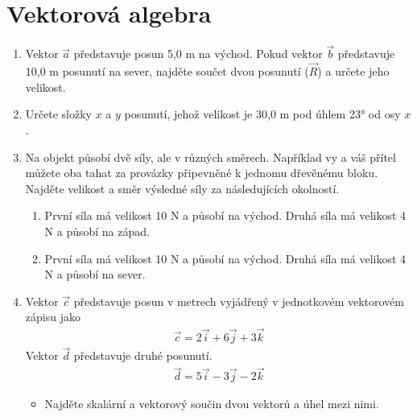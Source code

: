 \documentclass[letterpaper,10pt,english]{jupyterBook}
\begin{document}
{{\section{Vektorová algebra}
\label{\detokenize{Cviceni/C1:vektorova-algebra}}\begin{enumerate}
%
\item {} 
\sphinxAtStartPar
Vektor \(\vec{a}\) představuje posun 5,0 m na východ. Pokud vektor \(\vec{b}\) představuje 10,0 m posunutí na sever, najděte součet dvou posunutí (\(\vec{R}\)) a určete jeho velikost.

\item {} 
\sphinxAtStartPar
Určete složky \(x\) a \(y\) posunutí, jehož velikost je 30,0 m pod úhlem 23° od osy \(x\).

\item {} 
\sphinxAtStartPar
Na objekt působí dvě síly, ale v různých směrech. Například vy a váš přítel můžete oba tahat za provázky připevněné k jednomu dřevěnému bloku. Najděte velikost a směr výsledné síly za následujících okolností.
\begin{enumerate}
%
\item {} 
\sphinxAtStartPar
První síla má velikost 10 N a působí na východ. Druhá síla má velikost 4 N a působí na západ.

\item {} 
\sphinxAtStartPar
První síla má velikost 10 N a působí na východ. Druhá síla má velikost 4 N a působí na sever.

\end{enumerate}

\item {} 
\sphinxAtStartPar
Vektor \(\vec{c}\) představuje posun v metrech vyjádřený v jednotkovém vektorovém zápisu jako
\begin{equation*}
\begin{split}\vec{c} = 2 \vec{i} + 6 \vec{j} + 3 \vec{k}\end{split}
\end{equation*}
\sphinxAtStartPar
Vektor \(\vec{d}\) představuje druhé posunutí.
\begin{equation*}
\begin{split}\vec{d} = 5 \vec{i} - 3 \vec{j} - 2 \vec{k}\end{split}
\end{equation*}\begin{itemize}
\item {} 
\sphinxAtStartPar
Najděte skalární a vektorový součin dvou vektorů a úhel mezi nimi.


\end{itemize}
\end{enumerate}}}
\end{document}
